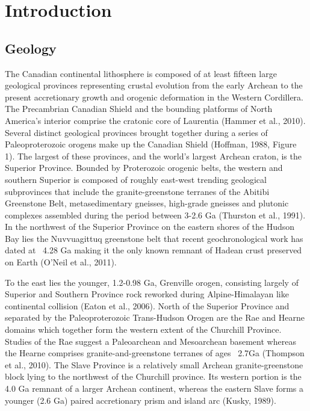 \documentclass[msc,oneside]{ubcthesis}
\begin{document}
\tableofcontents
\listoftables
\listoffigures


\mainmatter


\chapter{Introduction} \label{cha:intro}

\section{Geology}
The Canadian continental lithosphere is composed of at least fifteen large geological provinces representing crustal evolution from the early Archean to the present accretionary growth and orogenic deformation in the Western Cordillera. The Precambrian Canadian Shield and the bounding platforms of North America's interior comprise the cratonic core of Laurentia (Hammer et al., 2010). Several distinct geological provinces brought together during a series of Paleoproterozoic orogens make up the Canadian Shield (Hoffman, 1988, Figure 1). The largest of these provinces, and the world's largest Archean craton, is the Superior Province. Bounded by Proterozoic orogenic belts, the western and southern Superior is composed of roughly east-west trending geological subprovinces that include the granite-greenstone terranes of the Abitibi Greenstone Belt, metasedimentary gneisses, high-grade gneisses and plutonic complexes assembled during the period between 3-2.6 Ga (Thurston et al., 1991). In the northwest of the Superior Province on the eastern shores of the Hudson Bay lies the Nuvvuagittuq greenstone belt that recent geochronological work has dated at ~4.28 Ga making it the only known remnant of Hadean crust preserved on Earth (O'Neil et al., 2011).

To the east lies the younger, 1.2-0.98 Ga, Grenville orogen, consisting largely of Superior and Southern Province rock reworked during Alpine-Himalayan like continental collision (Eaton et al., 2006). North of the Superior Province and separated by the Paleoproterozoic Trans-Hudson Orogen are the Rae and Hearne domains which together form the western extent of the Churchill Province. Studies of the Rae suggest a Paleoarchean and Mesoarchean basement whereas the Hearne comprises granite-and-greenstone terranes of ages ~2.7Ga (Thompson et al., 2010). The Slave Province is a relatively small Archean granite-greenstone block lying to the northwest of the Churchill province. Its western portion is the 4.0 Ga remnant of a larger Archean continent, whereas the eastern Slave forms a younger (2.6 Ga) paired accretionary prism and island arc (Kusky, 1989).
\end{document}
